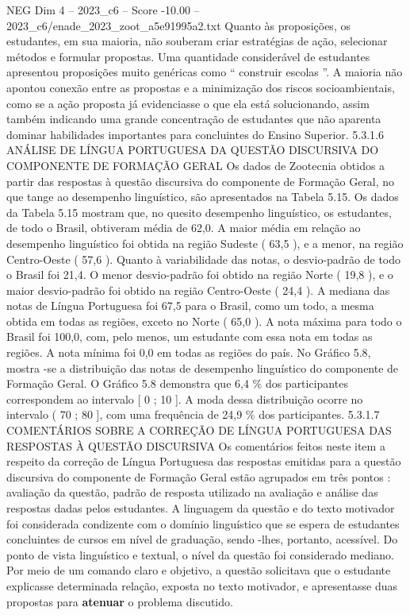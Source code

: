 \begin{textsample}{NEG Dim 4 – 2023\_c6 – Score -10.00 – 2023\_c6/enade\_2023\_zoot\_a5e91995a2.txt}
Quanto às proposições, os estudantes, em sua maioria, não souberam criar estratégias de ação, selecionar métodos e formular propostas.
Uma quantidade considerável de estudantes apresentou proposições muito genéricas como “ construir escolas ”.
A maioria não apontou conexão entre as propostas e a minimização dos riscos socioambientais, como se a ação proposta já evidenciasse o que ela está solucionando, assim também indicando uma grande concentração de estudantes que não aparenta dominar habilidades importantes para concluintes do Ensino Superior. 5.3.1.6 ANÁLISE DE LÍNGUA PORTUGUESA DA QUESTÃO DISCURSIVA DO COMPONENTE DE FORMAÇÃO GERAL Os dados de Zootecnia obtidos a partir das respostas à questão discursiva do componente de Formação Geral, no que tange ao desempenho linguístico, são apresentados na Tabela 5.15.
Os dados da Tabela 5.15 mostram que, no quesito desempenho linguístico, os estudantes, de todo o Brasil, obtiveram média de 62,0.
A maior média em relação ao desempenho linguístico foi obtida na região Sudeste ( 63,5 ), e a menor, na região Centro-Oeste ( 57,6 ).
Quanto à variabilidade das notas, o desvio-padrão de todo o Brasil foi 21,4.
O menor desvio-padrão foi obtido na região Norte ( 19,8 ), e o maior desvio-padrão foi obtido na região Centro-Oeste ( 24,4 ).
A mediana das notas de Língua Portuguesa foi 67,5 para o Brasil, como um todo, a mesma obtida em todas as regiões, exceto no Norte ( 65,0 ).
A nota máxima para todo o Brasil foi 100,0, com, pelo menos, um estudante com essa nota em todas as regiões.
A nota mínima foi 0,0 em todas as regiões do país.
No Gráfico 5.8, mostra -se a distribuição das notas de desempenho linguístico do componente de Formação Geral.
O Gráfico 5.8 demonstra que 6,4 \% dos participantes correspondem ao intervalo [ 0 ; 10 ].
A moda dessa distribuição ocorre no intervalo ( 70 ; 80 ], com uma frequência de 24,9 \% dos participantes. 5.3.1.7 COMENTÁRIOS SOBRE A CORREÇÃO DE LÍNGUA PORTUGUESA DAS RESPOSTAS À QUESTÃO DISCURSIVA Os comentários feitos neste item a respeito da correção de Língua Portuguesa das respostas emitidas para a questão discursiva do componente de Formação Geral estão agrupados em três pontos : avaliação da questão, padrão de resposta utilizado na avaliação e análise das respostas dadas pelos estudantes.
A linguagem da questão e do texto motivador foi considerada condizente com o domínio linguístico que se espera de estudantes concluintes de cursos em nível de graduação, sendo -lhes, portanto, acessível.
Do ponto de vista linguístico e textual, o nível da questão foi considerado mediano.
Por meio de um comando claro e objetivo, a questão solicitava que o estudante explicasse determinada relação, exposta no texto motivador, e apresentasse duas propostas para \textbf{atenuar} o problema discutido.

\end{textsample}
